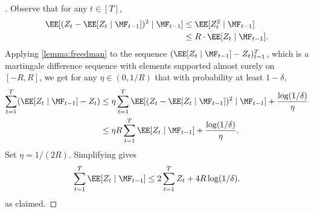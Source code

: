 \begin{proof}[]
Observe that for any $t \in [T]$,
\begin{align}
\EE[(Z_t - \EE[Z_t\mid \MF_{t-1}])^2\mid \MF_{t-1}]
&\leq \EE[Z_t^2\mid \MF_{t-1}] \\ 
&\leq R \cdot \EE[Z_t\mid \MF_{t-1}].
\end{align}
Applying \cref{lemma:freedman} to the sequence $(\EE[Z_t\mid \MF_{t-1}] - Z_t)_{t=1}^T$, which is a martingale difference sequence with elements supported almost surely on $[-R,R]$, we get for any $\eta \in (0,1/R)$ that with probability at least $1-\delta$,
\begin{align}
\sum_{t=1}^T (\EE[Z_t\mid \MF_{t-1}] - Z_t)
&\leq \eta \sum_{t=1}^T \EE[(Z_t - \EE[Z_t\mid \MF_{t-1}])^2\mid \MF_{t-1}] + \frac{\log(1/\delta)}{\eta} \\ 
&\leq \eta R \sum_{t=1}^T \EE[Z_t\mid \MF_{t-1}] + \frac{\log(1/\delta)}{\eta}.
\end{align}
Set $\eta = 1/(2R)$. Simplifying gives
\[\sum_{t=1}^T \EE[Z_t\mid \MF_{t-1}] \leq 2\sum_{t=1}^T Z_t + 4R\log(1/\delta).\]
as claimed.
\end{proof}


